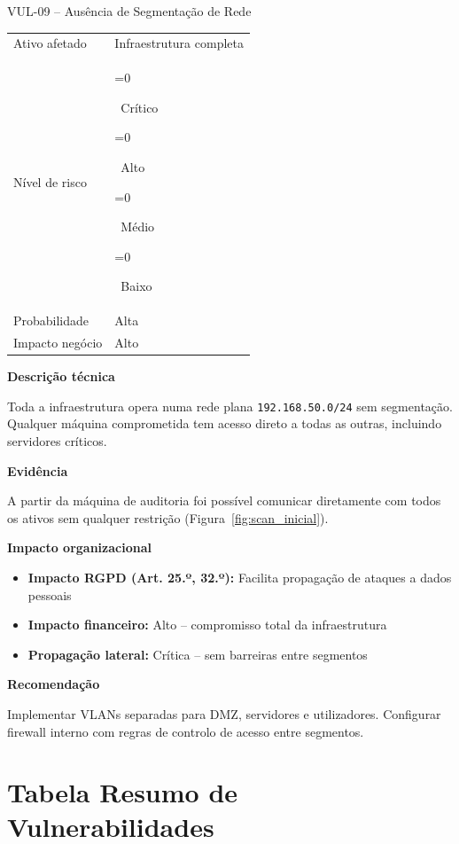\documentclass[12pt, a4paper]{report}
\newcommand{\risk}[1]{%
  \ifnum\pdfstrcmp{#1}{Critico}=0{\colorbox{Critical}{\color{white}\bfseries\footnotesize\strut~Crítico~}}\fi
  \ifnum\pdfstrcmp{#1}{Alto}=0{\colorbox{High}{\color{white}\bfseries\footnotesize\strut~Alto~}}\fi
  \ifnum\pdfstrcmp{#1}{Medio}=0{\colorbox{Medium}{\color{black}\bfseries\footnotesize\strut~Médio~}}\fi
  \ifnum\pdfstrcmp{#1}{Baixo}=0{\colorbox{Low}{\color{white}\bfseries\footnotesize\strut~Baixo~}}\fi}
\begin{document}
\begin{finding}{VUL-09 -- Ausência de Segmentação de Rede}
\begin{tabular}{@{}ll@{}}
  \small\color{TextGray}Ativo afetado   & Infraestrutura completa \\[3pt]
  \small\color{TextGray}Nível de risco  & \risk{Alto} \\[3pt]
  \small\color{TextGray}Probabilidade   & Alta \\[3pt]
  \small\color{TextGray}Impacto negócio & Alto \\
\end{tabular}

\vspace{8pt}\textbf{Descrição técnica}

Toda a infraestrutura opera numa rede plana \texttt{192.168.50.0/24} sem segmentação.
Qualquer máquina comprometida tem acesso direto a todas as outras, incluindo servidores críticos.

\vspace{6pt}\textbf{Evidência}

A partir da máquina de auditoria foi possível comunicar diretamente com todos os ativos sem
qualquer restrição (Figura~\ref{fig:scan_inicial}).

\vspace{4pt}\textbf{Impacto organizacional}
\begin{itemize}[itemsep=1pt]
  \item \textbf{Impacto RGPD (Art. 25.º, 32.º):} Facilita propagação de ataques a dados pessoais
  \item \textbf{Impacto financeiro:} Alto -- compromisso total da infraestrutura
  \item \textbf{Propagação lateral:} Crítica -- sem barreiras entre segmentos
\end{itemize}

\vspace{4pt}\textbf{Recomendação}

Implementar VLANs separadas para DMZ, servidores e utilizadores. Configurar firewall interno
com regras de controlo de acesso entre segmentos.
\end{finding}

\section{Tabela Resumo de Vulnerabilidades}
\end{document}
